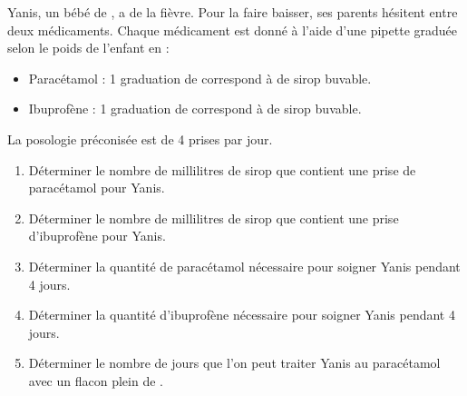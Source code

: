 \begin{exercice*}
   Yanis, un bébé de , a de la fièvre. Pour la faire baisser, ses parents hésitent entre deux médicaments.
   Chaque médicament est donné à l'aide d'une pipette graduée selon le poids de l'enfant en \Masse[kg]{} :
   \begin{itemize}
      \item Paracétamol : 1 graduation de  correspond à  de sirop buvable.
      \item Ibuprofène : 1 graduation de   correspond à  de sirop buvable.
   \end{itemize}
   La posologie préconisée  est de 4 prises par jour.
   \begin{enumerate}
      \item Déterminer le nombre de millilitres de sirop que contient une prise de paracétamol pour Yanis.
      \item Déterminer le nombre de millilitres de sirop que contient une prise d'ibuprofène pour Yanis.
      \item Déterminer la quantité de paracétamol nécessaire pour soigner Yanis pendant 4 jours.
      \item Déterminer la quantité d'ibuprofène nécessaire pour soigner Yanis pendant 4 jours.
      \item Déterminer le nombre de jours que l'on peut traiter Yanis au paracétamol avec un flacon plein de .
   \end{enumerate}
\end{exercice*}